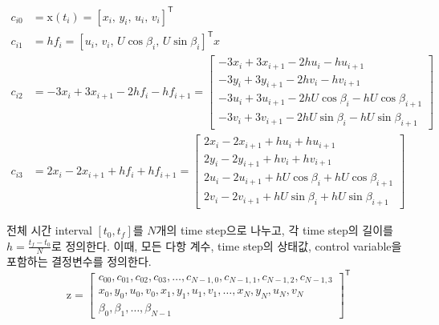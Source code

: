 \begin{equation}
	\begin{aligned}
		c_{i0} & = \mathrm{x}(t_i) = [x_i,\, y_i,\, u_i,\, v_i]^\mathsf{T}                                     \\
		c_{i1} & = hf_i = [u_i,\, v_i,\, U\cos\beta_i,\, U\sin\beta_i]^\mathsf{T}x                             \\
		c_{i2} & = -3x_i + 3x_{i+1} - 2hf_i - hf_{i+1} = \begin{bmatrix}
			                                                 -3x_i + 3x_{i+1} - 2hu_i - hu_{i+1}                   \\
			                                                 -3y_i + 3y_{i+1} - 2hv_i - hv_{i+1}                   \\
			                                                 -3u_i + 3u_{i+1} - 2hU\cos\beta_i - hU\cos\beta_{i+1} \\
			                                                 -3v_i + 3v_{i+1} - 2hU\sin\beta_i - hU\sin\beta_{i+1}
		                                                 \end{bmatrix} \\
		c_{i3} & = 2x_i - 2x_{i+1} + hf_i + hf_{i+1} = \begin{bmatrix}
			                                               2x_i - 2x_{i+1} + hu_i + hu_{i+1}                   \\
			                                               2y_i - 2y_{i+1} + hv_i + hv_{i+1}                   \\
			                                               2u_i - 2u_{i+1} + hU\cos\beta_i + hU\cos\beta_{i+1} \\
			                                               2v_i - 2v_{i+1} + hU\sin\beta_i + hU\sin\beta_{i+1}
		                                               \end{bmatrix}
	\end{aligned}
\end{equation}

전체 시간 interval $[t_0, t_f]$를 $N$개의 time step으로 나누고, 각 time step의 길이를 $h = \frac{t_f - t_0}{N}$로 정의한다.
이때, 모든 다항 계수, time step의 상태값, control variable을 포함하는 결정변수를 정의한다.
\begin{equation}\label{dirCol:eq4}
	\mathrm{z} = \begin{bmatrix}
		c_{00}, c_{01}, c_{02}, c_{03}, \ldots, c_{N-1,0}, c_{N-1,1}, c_{N-1,2}, c_{N-1,3} \\
		x_0, y_0, u_0, v_0, x_1, y_1, u_1, v_1, \ldots, x_N, y_N, u_N, v_N                 \\
		\beta_0, \beta_1, \ldots, \beta_{N-1}
	\end{bmatrix}^\mathsf{T}
\end{equation}

